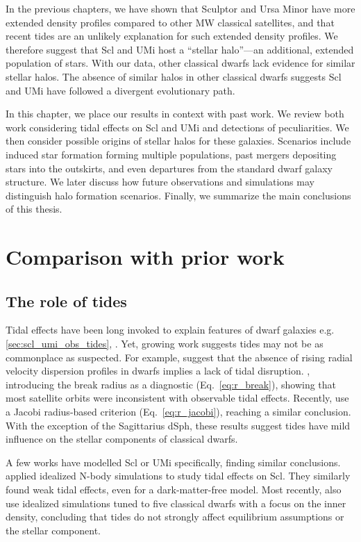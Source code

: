 In the previous chapters, we have shown that Sculptor and Ursa Minor
have more extended density profiles compared to other MW classical
satellites, and that recent tides are an unlikely explanation for such
extended density profiles. We therefore suggest that Scl and UMi host a
``stellar halo''---an additional, extended population of stars. With our
data, other classical dwarfs lack evidence for similar stellar halos.
The absence of similar halos in other classical dwarfs suggests Scl and
UMi have followed a divergent evolutionary path.

In this chapter, we place our results in context with past work. We
review both work considering tidal effects on Scl and UMi and detections
of peculiarities. We then consider possible origins of stellar halos for
these galaxies. Scenarios include induced star formation forming
multiple populations, past mergers depositing stars into the outskirts,
and even departures from the standard dwarf galaxy structure. We later
discuss how future observations and simulations may distinguish halo
formation scenarios. Finally, we summarize the main conclusions of this
thesis.

\section{Comparison with prior work}\label{comparison-with-prior-work}

\subsection{The role of tides}\label{the-role-of-tides}

Tidal effects have been long invoked to explain features of dwarf
galaxies e.g. \ref{sec:scl_umi_obs_tides},
\citep{tsujimoto+shigeyama2002, mayer+2001a}. Yet, growing work suggests
tides may not be as commonplace as suspected. For example,
\citet{read+2006} suggest that the absence of rising radial velocity
dispersion profiles in dwarfs implies a lack of tidal disruption.
\citet{penarrubia+2009}, introducing the break radius as a diagnostic
(Eq.~\ref{eq:r_break}), showing that most satellite orbits were
inconsistent with observable tidal effects. Recently,
\citet{pace+erkal+li2022} use a Jacobi radius-based criterion
(Eq.~\ref{eq:r_jacobi}), reaching a similar conclusion. With the
exception of the Sagittarius dSph, these results suggest tides have mild
influence on the stellar components of classical dwarfs.

A few works have modelled Scl or UMi specifically, finding similar
conclusions. \citet{iorio+2019} applied idealized N-body simulations to
study tidal effects on Scl. They similarly found weak tidal effects,
even for a dark-matter-free model. Most recently,
\citet{tchiorniy+genina2025} also use idealized simulations tuned to
five classical dwarfs with a focus on the inner density, concluding that
tides do not strongly affect equilibrium assumptions or the stellar
component.

